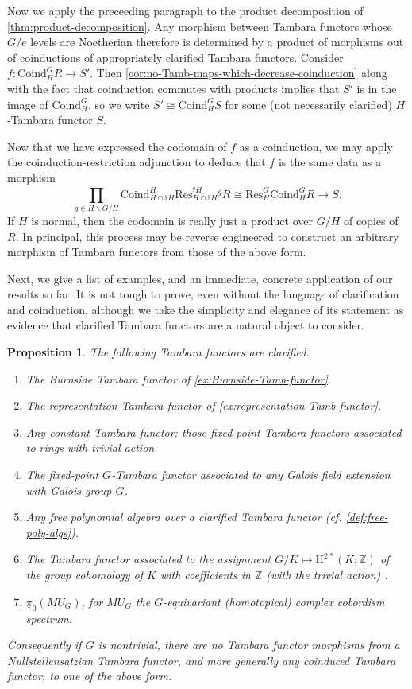 \documentclass[11pt,dvipsnames]{amsart}
\newtheorem{proposition}[theorem]{Proposition}
\theoremstyle{BoldRemark}
\begin{document}
Now we apply the preceeding paragraph to the product decomposition of \cref{thm:product-decomposition}. Any morphism between Tambara functors whose $G/e$ levels are Noetherian therefore is determined by a product of morphisms out of coinductions of appropriately clarified Tambara functors. Consider $f : \mathrm{Coind}_H^G R \rightarrow S'$. Then \cref{cor:no-Tamb-maps-which-decrease-coinduction} along with the fact that coinduction commutes with products implies that $S'$ is in the image of $\mathrm{Coind}_H^G$, so we write $S' \cong \mathrm{Coind}_H^G S$ for some (not necessarily clarified) $H$-Tambara functor $S$.

Now that we have expressed the codomain of $f$ as a coinduction, we may apply the coinduction-restriction adjunction to deduce that $f$ is the same data as a morphism \[ \prod_{g \in H \backslash G / H} \mathrm{Coind}_{H \cap {}^g H}^H \mathrm{Res}_{H \cap {}^g H}^{{}^g H} {}^g R \cong \mathrm{Res}_H^G \mathrm{Coind}_H^G R \rightarrow S . \] If $H$ is normal, then the codomain is really just a product over $G/H$ of copies of $R$. In principal, this process may be reverse engineered to construct an arbitrary morphism of Tambara functors from those of the above form. 

Next, we give a list of examples, and an immediate, concrete application of our results so far. It is not tough to prove, even without the language of clarification and coinduction, although we take the simplicity and elegance of its statement as evidence that clarified Tambara functors are a natural object to consider.

\begin{proposition}\label{prop:examples}
	The following Tambara functors are clarified.
	\begin{enumerate}
		\item The Burnside Tambara functor of \cref{ex:Burnside-Tamb-functor}.
		\item The representation Tambara functor of \cref{ex:representation-Tamb-functor}.
		\item Any constant Tambara functor: those fixed-point Tambara functors associated to rings with trivial action.
		\item The fixed-point $G$-Tambara functor associated to any Galois field extension with Galois group $G$.
		\item Any free polynomial algebra over a clarified Tambara functor (cf. \cref{def:free-poly-algs}).
		\item The Tambara functor associated to the assignment $G/K \mapsto \mathrm{H}^{2*}(K;\mathbb{Z})$ of the group cohomology of $K$ with coefficients in $\mathbb{Z}$ (with the trivial action) \cite{Eve63} \cite{Tam93}.
		\item $\underline{\pi}_0(MU_G)$, for $MU_G$ the $G$-equivariant (homotopical) complex cobordism spectrum.
	\end{enumerate}
	Consequently if $G$ is nontrivial, there are no Tambara functor morphisms from a Nullstellensatzian Tambara functor, and more generally any coinduced Tambara functor, to one of the above form.
\end{proposition}
\end{document}

